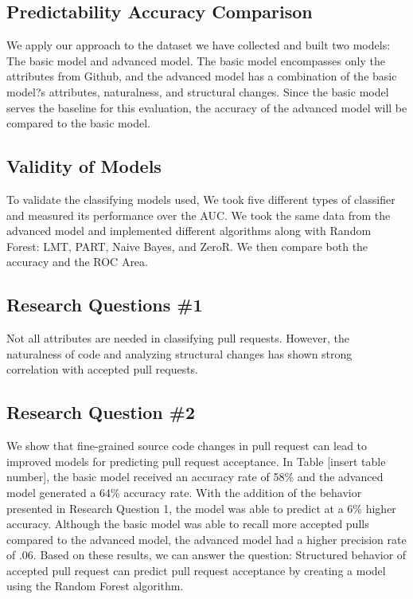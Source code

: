 \documentclass[10pt, conference]{IEEEtran}
\begin{document}
\subsection{Predictability Accuracy Comparison}
We apply our approach to the dataset we have collected and built two models: The basic model and advanced model. The basic model encompasses only the attributes from Github, and the advanced model has a combination of the basic model?s attributes, naturalness, and structural changes. Since the basic model serves the baseline for this evaluation, the accuracy of the advanced model will be compared to the basic model. 

\subsection{Validity of Models}
To validate the classifying models used, We took five different types of classifier and measured its performance over the AUC. We took the same data from the advanced model and implemented different algorithms along with Random Forest: LMT, PART, Naive Bayes, and ZeroR. We then compare both the accuracy and the ROC Area.

\subsection{Research Questions \#1}
Not all attributes are needed in classifying pull requests. However, the naturalness of code and analyzing structural changes has shown strong correlation with accepted pull requests. 

\subsection{Research Question \#2}
We show that fine-grained source code changes in pull request can lead to improved models for predicting pull request acceptance. In Table [insert table number], the basic model received an accuracy rate of 58\% and the advanced model generated a 64\% accuracy rate. With the addition of the behavior presented in Research Question 1, the model was able to predict at a 6\% higher accuracy. Although the basic model was able to recall more accepted pulls compared to the advanced model, the advanced model had a higher precision rate of .06. Based on these results, we can answer the question: Structured behavior of accepted pull request can predict pull request acceptance by creating a model using the Random Forest algorithm.
\end{document}
